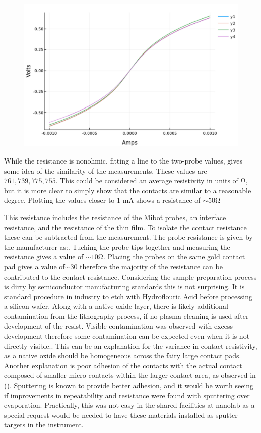 \begin{figure}
    \centering
    \includegraphics[width=\textwidth]{fig/Results/2pnt_compareMb25.jpg}
    \caption{}
    \label{fig:mb25 2pnt}
\end{figure}

While the resistance is nonohmic, fitting a line to the two-probe values, gives some idea of the similarity of the measurements. These values are $761, 739, 775, 755$. This could be considered an average resistivity in units of $\si{\ohm}$, but it is more clear to simply show that the contacts are similar to a reasonable degree. Plotting the values closer to 1 mA shows a resistance of $\sim 50 \si{\ohm}$  

This resistance includes the resistance of the Mibot probes, an interface resistance, and the resistance of the thin film. To isolate the contact resistance these can be subtracted from the measurement. The probe resistance is given by the manufacturer as:. Tuching the probe tips together and measuring the resistance gives a value of $\sim 10 \si{\ohm}$. Placing the probes on the same gold contact pad gives a value of$\sim 30$ therefore the majority of the resistance can be contributed to the contact resistance. Considering the sample preparation process is dirty by semiconductor manufacturing standards this is not surprising. It is standard procedure in industry to etch with Hydroflouric Acid before processing a silicon wafer.  Along with a native oxide layer, there is likely additional contamination from the lithography process, if no plasma cleaning is used after development of the resist. Visible contamination was observed with excess development therefore some contamination can be expected even when it is not directly visible.. This can be an explanation for the variance in contact resistivity, as a native oxide should be homogeneous across the fairy large contact pads. Another explanation is  poor adhesion of the contacts with the actual contact composed of smaller micro-contacts within the larger contact area, as observed in (). Sputtering is known to provide better adhesion, and it would be worth seeing if improvements in repeatability and resistance were found with sputtering over evaporation. Practically, this was not easy in the shared facilities at nanolab as a special request would be needed to have these materials installed as sputter targets in the instrument. 
 


